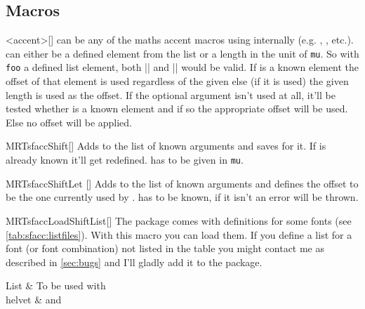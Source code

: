 \subsection{Macros}
\begin{describemacro}{<accent>}[]%
   can be any of the maths accent macros using 
  internally (e.g. , , etc.).\\
   can either be a defined element from the list or a length in the
  unit of \texttt{mu}. So with \texttt{foo} a defined list element, both
  \bverb|| and \bverb|| would be valid. If
   is a known element the offset of that element is used regardless of
  the given  else (if it is used) the given length is used as the
  offset. If the optional argument isn't used at all, it'll be tested whether
   is a known element and if so the appropriate offset will be used.
  Else no offset will be applied.
\end{describemacro}%

\begin{describemacro}{MRTsfaccShift}[]%
  Adds  to the list of known arguments and saves  for
  it. If  is already known it'll get redefined.  has
  to be given in \texttt{mu}.
\end{describemacro}%

\begin{describemacro}{MRTsfaccShiftLet}%
  []
  Adds  to the list of known arguments and defines the
  offset to be the one currently used by .
   has to be known, if it isn't an error will be thrown.
\end{describemacro}%

\begin{describemacro}{MRTsfaccLoadShiftList}[]
  The package comes with definitions for some fonts (see
  \autoref{tab:sfacc:listfiles}). With this macro you can load them. If you
  define a list for a font (or font combination) not listed in the table you
  might contact me as described in \autoref{sec:bugs} and I'll gladly add it
  to the package.
\end{describemacro}

\begin{MRTtable}%
  [
    ,col={>{\ttfamily}l >{\raggedright\arraybackslash}p{.55\linewidth}}
    ,cap={Available shift definition lists}
    ,label={tab:sfacc:listfiles}
  ]
    \normalfont List & To be used with\\
    helvet &  and 
    \\
\end{MRTtable}%

